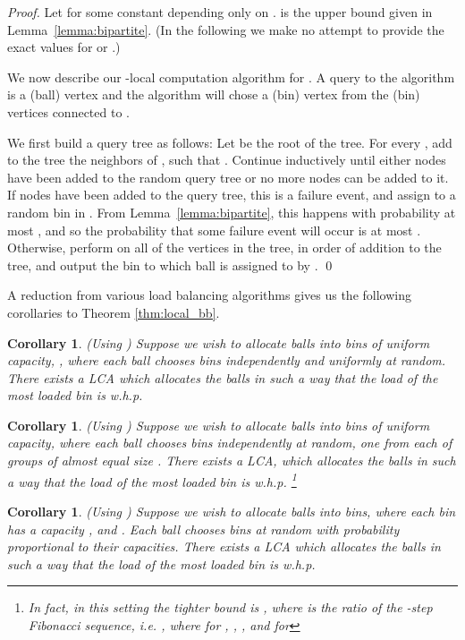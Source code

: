 \documentclass[english, oribibl]{llncs}
\newtheorem{corollary}[theorem]{Corollary}
\begin{document}
\begin{proof}
Let  for some constant  depending only on .
 is the upper bound given in Lemma~\ref{lemma:bipartite}.
(In the following we make no attempt to provide the exact values for  or .)

We now describe our -local computation algorithm for .
A query to the algorithm is a (ball) vertex  and the
algorithm will chose a (bin) vertex   from the  (bin) vertices  connected to .

We first build a query tree as follows:
Let  be the root of the tree. For every , add to the tree the neighbors of ,
 such that .
Continue inductively until either  nodes have been added to the random query tree
or no more nodes can be added to it.
If  nodes have been added to the query tree, this is a failure event, and assign to  a random bin in .
From Lemma~\ref{lemma:bipartite}, this happens with probability at most ,
and so the probability that some failure event will occur is at most .
Otherwise, perform  on all of the vertices in the tree,
in order of addition to the tree, and output the bin to which ball  is assigned to by . \qed
\end{proof}

A reduction from various load balancing algorithms gives us the following corollaries to Theorem \ref{thm:local_bb}.

\begin{corollary}  (Using \cite{BCS+06}) 
Suppose we wish to allocate  balls into  bins of uniform capacity, , where each ball chooses  bins independently and uniformly at random. There exists 
a  LCA which allocates the balls in such a way that the load of the most loaded bin is  w.h.p.
\end{corollary}

\begin{corollary} (Using  \cite{Voc03}) 
Suppose we wish to allocate  balls into  bins of uniform capacity, where each ball chooses  bins independently at random, one from each of  groups of almost equal size . There exists 
a  LCA, which allocates the balls in such a way that the load of the most loaded bin is  w.h.p.
\footnote{In fact, in this setting the tighter bound is
, where  is the ratio of the -step Fibonacci sequence, i.e. 
, 
where for , , , and for   }
\end{corollary}

\begin{corollary} (Using  \cite{BBFN10}) 
Suppose we wish to allocate  balls into  bins, where each bin  has a capacity , and . Each ball chooses  bins at random with probability proportional to their capacities. There exists a   LCA which allocates the balls in such a way that the load of the most loaded bin is  w.h.p.
\end{corollary}
\end{document}
